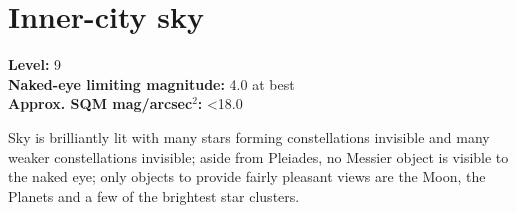 \section{Inner-city sky}
\textbf{Level:} 9 \\
\textbf{Naked-eye limiting magnitude:} 4.0 at best \\
\textbf{Approx. SQM mag/arcsec$^2$:} <18.0

Sky is brilliantly lit with many stars forming constellations
invisible and many weaker constellations invisible; aside from
Pleiades, no Messier object is visible to the naked eye; only objects
to provide fairly pleasant views are the Moon, the Planets and a few
of the brightest star clusters.



